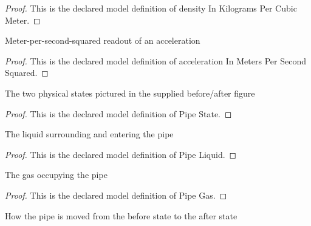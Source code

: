 \begin{proof}
  This is the declared model definition of density In Kilograms Per Cubic Meter.
\end{proof}
\begin{definition}
  \label{def:physics:phyx-mini-0364:phyxminiproblems-problemphyxmini0364-accelerationinmeterspersecondsquared}
  Meter-per-second-squared readout of an acceleration
\end{definition}
\begin{proof}
  This is the declared model definition of acceleration In Meters Per Second Squared.
\end{proof}
\begin{definition}
  \label{def:physics:phyx-mini-0364:phyxminiproblems-problemphyxmini0364-pipestate}
  The two physical states pictured in the supplied before/after figure
\end{definition}
\begin{proof}
  This is the declared model definition of Pipe State.
\end{proof}
\begin{definition}
  \label{def:physics:phyx-mini-0364:phyxminiproblems-problemphyxmini0364-pipeliquid}
  The liquid surrounding and entering the pipe
\end{definition}
\begin{proof}
  This is the declared model definition of Pipe Liquid.
\end{proof}
\begin{definition}
  \label{def:physics:phyx-mini-0364:phyxminiproblems-problemphyxmini0364-pipegas}
  The gas occupying the pipe
\end{definition}
\begin{proof}
  This is the declared model definition of Pipe Gas.
\end{proof}
\begin{definition}
  \label{def:physics:phyx-mini-0364:phyxminiproblems-problemphyxmini0364-immersionprotocol}
  How the pipe is moved from the before state to the after state
\end{definition}
